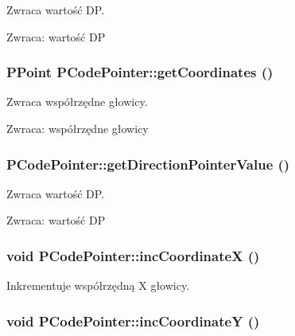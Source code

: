 Zwraca wartość DP. \begin{Desc}
\item[Zwraca:]wartość DP \end{Desc}
\hypertarget{classPCodePointer_c792e5bc527542482542ed22acc9cca4}{
\subsubsection[{getCoordinates}]{\setlength{\rightskip}{0pt plus 5cm}PPoint PCodePointer::getCoordinates ()}}
\label{classPCodePointer_c792e5bc527542482542ed22acc9cca4}


Zwraca współrzędne głowicy. \begin{Desc}
\item[Zwraca:]współrzędne głowicy \end{Desc}
\hypertarget{classPCodePointer_e0461a3d72af876b5b3c838a8b45a729}{
\subsubsection[{getDirectionPointerValue}]{ PCodePointer::getDirectionPointerValue ()}}
\label{classPCodePointer_e0461a3d72af876b5b3c838a8b45a729}


Zwraca wartość DP. \begin{Desc}
\item[Zwraca:]wartość DP \end{Desc}
\hypertarget{classPCodePointer_ef8324dbdca82baa094e47e36f978669}{
\subsubsection[{incCoordinateX}]{\setlength{\rightskip}{0pt plus 5cm}void PCodePointer::incCoordinateX ()}}
\label{classPCodePointer_ef8324dbdca82baa094e47e36f978669}


Inkrementuje współrzędną X głowicy. \hypertarget{classPCodePointer_58c15d4d1abb1fb971170f19c3b9e8cf}{
\subsubsection[{incCoordinateY}]{\setlength{\rightskip}{0pt plus 5cm}void PCodePointer::incCoordinateY ()}}
\label{classPCodePointer_58c15d4d1abb1fb971170f19c3b9e8cf}


